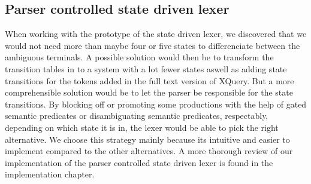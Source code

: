 \subsection{Parser controlled state driven lexer}
When working with the prototype of the state driven lexer, we discovered that we would not need more than maybe four or five states to differenciate between the ambiguous terminals. A possible solution would then be to transform the transition tables in \cite{createTokenizer} to a system with a lot fewer states aswell as adding state transitions for the tokens added in the full text version of XQuery. But a more comprehensible solution would be to let the parser be responsible for the state transitions. By blocking off or promoting some productions with the help of gated semantic predicates or disambiguating semantic predicates, respectably, depending on which state it is in, the lexer would be able to pick the right alternative. We choose this strategy mainly because its intuitive and easier to implement compared to the other alternatives. A more thorough review of our implementation of the parser controlled state driven lexer is found in the implementation chapter.
